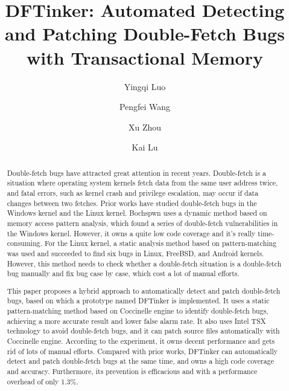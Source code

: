 \documentclass[10pt]{llncs}
\begin{document}
\title{DFTinker: Automated Detecting and Patching Double-Fetch Bugs with Transactional Memory}




\author{
Yingqi Luo \and
Pengfei Wang \and
Xu Zhou \and
Kai Lu}


\maketitle

\begin{abstract}
Double-fetch bugs have attracted great attention in recent years. 
Double-fetch is a situation where operating system kernels fetch data from the same user address twice, and fatal errors, such as kernel crash and privilege escalation, may occur if data changes between two fetches.
Prior works have studied double-fetch bugs in the Windows kernel and the Linux kernel. 
Bochspwn uses a dynamic method based on memory access pattern analysis, which found a series of double-fetch vulnerabilities in the Windows kernel. However, it owns a quite low code coverage and it's really time-consuming.
For the Linux kernel, a static analysis method based on pattern-matching was used and succeeded to find six bugs in Linux, FreeBSD, and Android kernels. 
However, this method needs to check whether a double-fetch situation is a double-fetch bug manually and fix bug case by case, which cost a lot of manual efforts.

This paper proposes a hybrid approach to automatically detect and patch double-fetch bugs, based on which a prototype named DFTinker is implemented. It uses a static pattern-matching method based on Coccinelle engine to identify double-fetch bugs, achieving a more accurate result and lower false alarm rate. It also uses Intel TSX technology to avoid double-fetch bugs, and it can patch source files automatically with Coccinelle engine. According to the experiment, it owns decent performance and gets rid of lots of manual efforts.
Compared with prior works, DFTinker can automatically detect and patch double-fetch bugs at the same time, and owns a high code coverage and accuracy. Furthermore, its prevention is efficacious and with a performance overhead of only 1.3\%.

\end{abstract}
\end{document}
